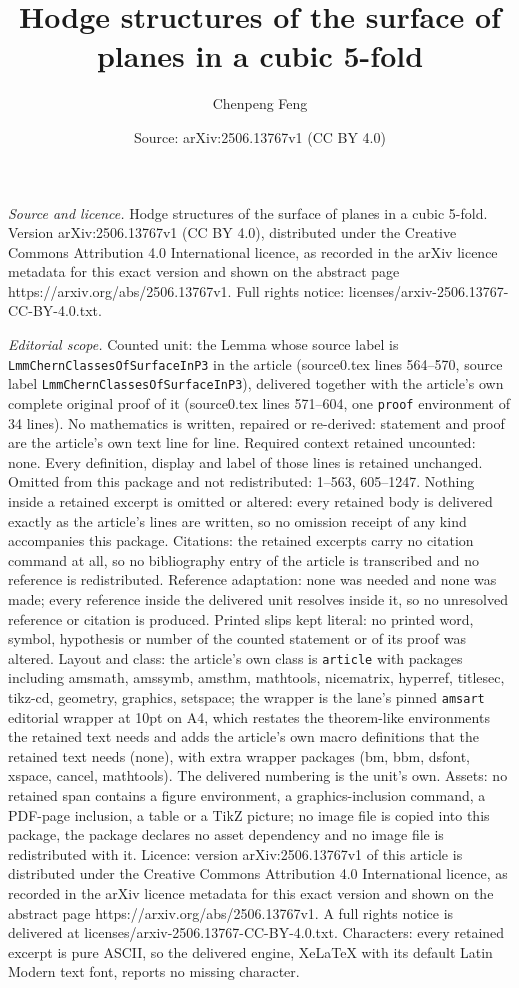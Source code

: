\documentclass[10pt,a4paper]{amsart}
\title[Hodge structures of the surface of planes in a cubic 5-fold]{Hodge structures of the surface of planes in a cubic 5-fold}
\author{Chenpeng Feng}
\date{Source: arXiv:2506.13767v1 (CC BY 4.0)}
\begin{document}
\maketitle

\noindent\emph{Source and licence.} Hodge structures of the surface of planes in a cubic 5-fold. Version arXiv:2506.13767v1 (CC BY 4.0), distributed under the Creative Commons Attribution 4.0 International licence, as recorded in the arXiv licence metadata for this exact version and shown on the abstract page https://arxiv.org/abs/2506.13767v1. Full rights notice: licenses/arxiv-2506.13767-CC-BY-4.0.txt.\par\smallskip

\noindent\textit{Editorial scope.} Counted unit: the Lemma whose source label is \texttt{LmmChernClassesOfSurfaceInP3} in the article (source0.tex lines 564--570, source label \texttt{LmmChernClassesOfSurfaceInP3}), delivered together with the article's own complete original proof of it (source0.tex lines 571--604, one \texttt{proof} environment of 34 lines). No mathematics is written, repaired or re-derived: statement and proof are the article's own text line for line. Required context retained uncounted: none. Every definition, display and label of those lines is retained unchanged. Omitted from this package and not redistributed: 1--563, 605--1247. Nothing inside a retained excerpt is omitted or altered: every retained body is delivered exactly as the article's lines are written, so no omission receipt of any kind accompanies this package. Citations: the retained excerpts carry no citation command at all, so no bibliography entry of the article is transcribed and no reference is redistributed. Reference adaptation: none was needed and none was made; every reference inside the delivered unit resolves inside it, so no unresolved reference or citation is produced. Printed slips kept literal: no printed word, symbol, hypothesis or number of the counted statement or of its proof was altered. Layout and class: the article's own class is \texttt{article} with packages including amsmath, amssymb, amsthm, mathtools, nicematrix, hyperref, titlesec, tikz-cd, geometry, graphics, setspace; the wrapper is the lane's pinned \texttt{amsart} editorial wrapper at 10pt on A4, which restates the theorem-like environments the retained text needs and adds the article's own macro definitions that the retained text needs (none), with extra wrapper packages (bm, bbm, dsfont, xspace, cancel, mathtools). The delivered numbering is the unit's own. Assets: no retained span contains a figure environment, a graphics-inclusion command, a PDF-page inclusion, a table or a TikZ picture; no image file is copied into this package, the package declares no asset dependency and no image file is redistributed with it. Licence: version arXiv:2506.13767v1 of this article is distributed under the Creative Commons Attribution 4.0 International licence, as recorded in the arXiv licence metadata for this exact version and shown on the abstract page https://arxiv.org/abs/2506.13767v1. A full rights notice is delivered at licenses/arxiv-2506.13767-CC-BY-4.0.txt. Characters: every retained excerpt is pure ASCII, so the delivered engine, XeLaTeX with its default Latin Modern text font, reports no missing character.
\end{document}
